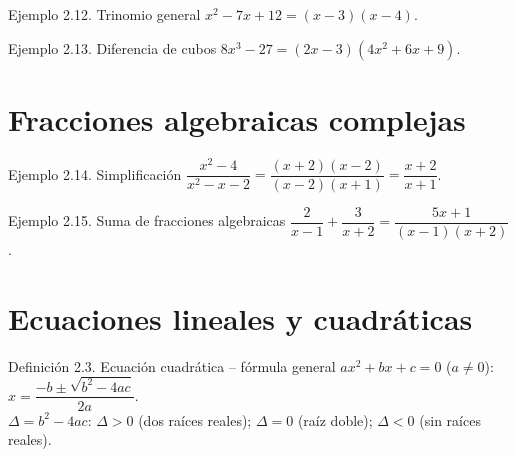 \documentclass[12pt,letterpaper]{book}
\begin{document}
\begin{ejbox}{Ejemplo 2.12. Trinomio general}
$x^2-7x+12=(x-3)(x-4)$.
\end{ejbox}

\begin{ejbox}{Ejemplo 2.13. Diferencia de cubos}
$8x^3-27=(2x-3)(4x^2+6x+9)$.
\end{ejbox}

\section{Fracciones algebraicas complejas}

\begin{ejbox}{Ejemplo 2.14. Simplificación}
$\dfrac{x^2-4}{x^2-x-2}=\dfrac{(x+2)(x-2)}{(x-2)(x+1)}=\dfrac{x+2}{x+1}$.
\end{ejbox}

\begin{ejbox}{Ejemplo 2.15. Suma de fracciones algebraicas}
$\dfrac{2}{x-1}+\dfrac{3}{x+2}=\dfrac{5x+1}{(x-1)(x+2)}$.
\end{ejbox}

\section{Ecuaciones lineales y cuadráticas}

\begin{center}
\end{center}

\begin{defbox}{Definición 2.3. Ecuación cuadrática -- fórmula general}
$ax^2+bx+c=0$ ($a\neq0$): $x=\dfrac{-b\pm\sqrt{b^2-4ac}}{2a}$.\\
$\Delta=b^2-4ac$: $\Delta>0$ (dos raíces reales); $\Delta=0$ (raíz doble); $\Delta<0$ (sin raíces reales).
\end{defbox}
\end{document}
